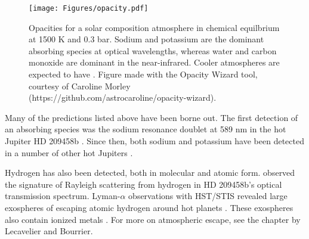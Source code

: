 \documentclass[graybox,natbib,nosecnum]{svmult}
\newcommand{\hbindex}[1]{\hl{#1}\index{#1}}  %
\begin{document}
\begin{figure}
\begin{centering}
\texttt{[image: Figures/opacity.pdf]}
\caption{Opacities for a solar composition atmosphere in chemical equilbrium at 1500 K and 0.3 bar. Sodium and potassium are the dominant absorbing species at optical wavelengths, whereas water and carbon monoxide are dominant in the near-infrared. Cooler atmospheres are expected to have . Figure made with the Opacity Wizard tool, courtesy of Caroline Morley (https://github.com/astrocaroline/opacity-wizard).}
\label{fig:opacity}       
\end{centering}
\end{figure}


Many of the predictions listed above have been borne out.  The first detection of an absorbing species was the sodium resonance doublet at 589 nm in the hot Jupiter HD 209458b \citep{charbonneau02}. Since then, both sodium and potassium have been detected in a number of other hot Jupiters \citep[e.g.][]{sing11b, nikolov14}. 

Hydrogen has also been detected, both in molecular and atomic form. \cite{lecavelier08} observed the signature of Rayleigh scattering from hydrogen in HD 209458b's optical transmission spectrum.  Lyman-$\alpha$ observations with HST/STIS revealed  large exospheres of escaping atomic hydrogen around hot planets \citep[e.g.][]{vidal-madjar03, ehrenreich15}.  These exospheres also contain ionized metals \citep[e.g., OI, CII;][]{vidal-madjar04}. For more on atmospheric escape, see the chapter by Lecavelier and Bourrier.
\end{document}

